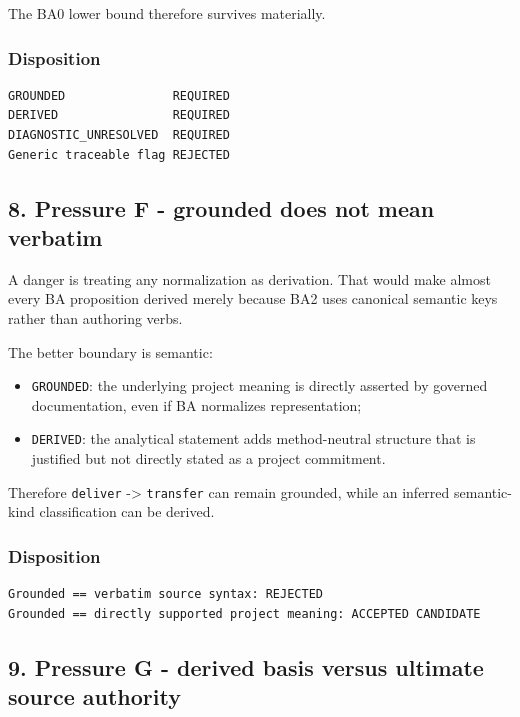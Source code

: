 \documentclass[11pt,a4paper]{article}
\providecommand{\tightlist}{\setlength{\itemsep}{0pt}\setlength{\parskip}{0pt}}
\begin{document}
The BA0 lower bound therefore survives materially.

\subsubsection{Disposition}\label{disposition-4}

\begin{verbatim}
GROUNDED               REQUIRED
DERIVED                REQUIRED
DIAGNOSTIC_UNRESOLVED  REQUIRED
Generic traceable flag REJECTED
\end{verbatim}

\subsection{8. Pressure F - grounded does not mean verbatim}\label{8-pressure-f---grounded-does-not-mean-verbatim}

A danger is treating any normalization as derivation. That would make almost every BA proposition derived merely because BA2 uses canonical semantic keys rather than authoring verbs.

The better boundary is semantic:

\begin{itemize}
\tightlist
\item
  \texttt{GROUNDED}: the underlying project meaning is directly asserted by governed documentation, even if BA normalizes representation;
\item
  \texttt{DERIVED}: the analytical statement adds method-neutral structure that is justified but not directly stated as a project commitment.
\end{itemize}

Therefore \texttt{deliver} -\textgreater{} \texttt{transfer} can remain grounded, while an inferred semantic-kind classification can be derived.

\subsubsection{Disposition}\label{disposition-5}

\begin{verbatim}
Grounded == verbatim source syntax: REJECTED
Grounded == directly supported project meaning: ACCEPTED CANDIDATE
\end{verbatim}

\subsection{9. Pressure G - derived basis versus ultimate source authority}\label{9-pressure-g---derived-basis-versus-ultimate-source-authority}
\end{document}
